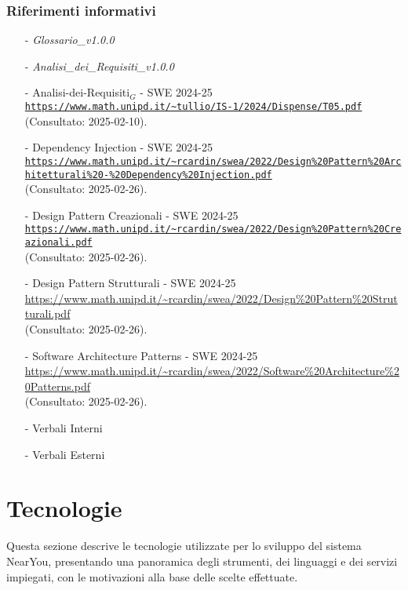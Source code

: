 \documentclass[10pt]{article}
\begin{document}
\subsubsection{Riferimenti informativi}
\begin{itemize}
    \item[-] \textit{Glossario\_v1.0.0}
    \item[-] \textit{Analisi\_dei\_Requisiti\_v1.0.0}
    \item[-] Analisi-dei-Requisiti$_G$ - SWE 2024-25\\
    \textcolor{blue}{\texttt{\url{https://www.math.unipd.it/\~tullio/IS-1/2024/Dispense/T05.pdf}}}\\ (Consultato: 2025-02-10).
    
    \item[-] Dependency Injection - SWE 2024-25\\    
    \textcolor{blue}{\texttt{\url{https://www.math.unipd.it/\~rcardin/swea/2022/Design\%20Pattern\%20Architetturali\%20-\%20Dependency\%20Injection.pdf}}}\\ (Consultato: 2025-02-26).
    
    \item[-] Design Pattern Creazionali - SWE 2024-25\\
    \textcolor{blue}{\texttt{\url{https://www.math.unipd.it/\~rcardin/swea/2022/Design\%20Pattern\%20Creazionali.pdf}}}\\ (Consultato: 2025-02-26).
    
    \item[-] Design Pattern Strutturali - SWE 2024-25\\
    \textcolor{blue}{\url{https://www.math.unipd.it/\~rcardin/swea/2022/Design\%20Pattern\%20Strutturali.pdf}}\\ (Consultato: 2025-02-26).
    
    \item[-] Software Architecture Patterns - SWE 2024-25\\
    \textcolor{blue}{\url{https://www.math.unipd.it/\~rcardin/swea/2022/Software\%20Architecture\%20Patterns.pdf}}\\ (Consultato: 2025-02-26).
    
    \item[-] Verbali Interni
    \item[-] Verbali Esterni
\end{itemize}


\section{Tecnologie}
Questa sezione descrive le tecnologie utilizzate per lo sviluppo del sistema NearYou, presentando una panoramica degli strumenti, dei linguaggi e dei servizi impiegati, con le motivazioni alla base delle scelte effettuate.
\end{document}
